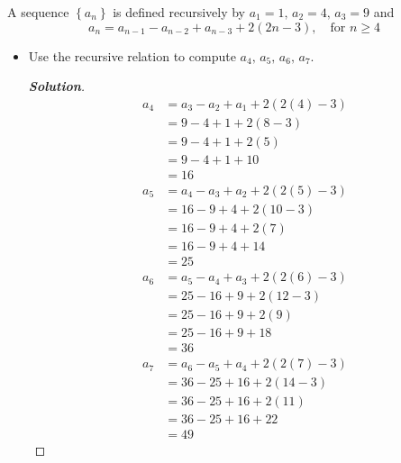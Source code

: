 \documentclass[11pt]{article}
\newenvironment{problem}[2][Problem\!]{\begin{trivlist}
\item[\hskip \labelsep {\bfseries #1}\hskip \labelsep {\bfseries #2.}]}{\end{trivlist}}
\newenvironment{solution}{\begin{proof}[\textbf{\textit{Solution}}]}{\end{proof}}
\newcommand{\set}[1]{\left\{#1\right\}} %
\renewcommand{\geq}{\geqslant}
\begin{document}
\begin{problem}{6.2}
A sequence $\set{a_n}$ is defined recursively by $a_1 = 1,\, a_2 = 4,\, a_3 = 9$ and
\[a_n = a_{n-1} - a_{n-2} + a_{n-3} + 2(2n - 3),\quad \text{for $n \geq 4$}\]
\begin{itemize}[itemsep=3em]
\item[(a)] Use the recursive relation to compute $a_4,\,a_5,\,a_6,\,a_7$.
\begin{solution}\hfill %
\begin{align*}
    a_4 &= a_3-a_2+a_1+2(2(4)-3)\\
    &= 9-4+1+2(8-3)\\
    &= 9-4+1+2(5)\\
    &= 9-4+1+10\\
    &= 16
\end{align*}
\begin{align*}
    a_5 &= a_4-a_3+a_2+2(2(5)-3)\\
    &= 16-9+4+2(10-3)\\
    &= 16-9+4+2(7)\\
    &= 16-9+4+14\\
    &= 25
\end{align*}
\begin{align*}
    a_6 &= a_5-a_4+a_3+2(2(6)-3)\\
    &= 25-16+9+2(12-3)\\
    &= 25-16+9+2(9)\\
    &= 25-16+9+18\\
    &= 36
\end{align*}
\begin{align*}
    a_7 &= a_6-a_5+a_4+2(2(7)-3)\\
    &= 36-25+16+2(14-3)\\
    &= 36-25+16+2(11)\\
    &= 36-25+16+22\\
    &= 49
\end{align*}
\end{solution}


\end{itemize}
\end{problem}
\end{document}
